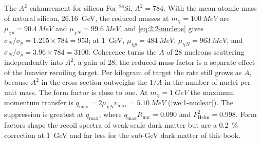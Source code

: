 \begin{workedexample}{The $A^2$ enhancement for silicon}\label{we:2-coherent}
For $^{28}$Si, $A^2 = 784$. With the mean atomic mass of natural silicon, \SI{26.16}{GeV}, the reduced masses at $m_\chi = \SI{100}{MeV}$ are $\mu_{\chi p} = \SI{90.4}{MeV}$ and $\mu_{\chi N} = \SI{99.6}{MeV}$, and \cref{eq:2.2-nucleus} gives $\sigma_N/\sigma_p = 1.215 \times 784 = 953$; at \SI{1}{GeV}, $\mu_{\chi p} = \SI{484}{MeV}$, $\mu_{\chi N} = \SI{963}{MeV}$, and $\sigma_N/\sigma_p = 3.96 \times 784 = 3100$. Coherence turns the $A$ of 28 nucleons scattering independently into $A^2$, a gain of 28; the reduced-mass factor is a separate effect of the heavier recoiling target. Per kilogram of target the rate still grows as $A$, because $A^2$ in the cross-section outweighs the $1/A$ in the number of nuclei per unit mass. The form factor is close to one. At $m_\chi = \SI{1}{GeV}$ the maximum momentum transfer is $q_{\mathrm{max}} = 2\mu_{\chi N}v_{\mathrm{max}} = \SI{5.10}{MeV}$ (\cref{we:1-nuclear}). The suppression is greatest at $q_{\mathrm{max}}$, where $q_{\mathrm{max}}R_{\mathrm{nuc}} = 0.090$ and $F_{\mathrm{Helm}}^2 = 0.998$. Form factors shape the recoil spectra of weak-scale dark matter but are a \SI{0.2}{\percent} correction at \SI{1}{GeV} and far less for the sub-GeV dark matter of this book.
\end{workedexample}
